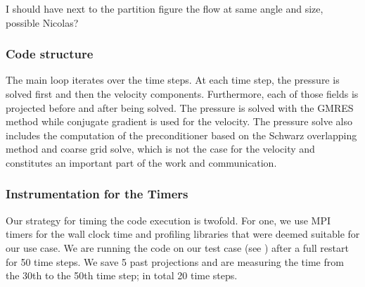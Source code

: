 \documentclass{sig-alternate}
\begin{document}
I should have next to the partition figure the flow at same angle and size, possible Nicolas? 
\subsubsection{Code structure}
\label{sec:code}

The main loop iterates over the time steps. At each time step, the pressure is solved first and then the velocity components. Furthermore, each of those fields is projected before and after being solved. The pressure is solved with the GMRES method while conjugate gradient is used for the velocity. The pressure solve also includes the computation of the preconditioner based on the Schwarz overlapping method and coarse grid solve, which is not the case for the velocity and constitutes an important part of the work and communication.

\subsubsection{Instrumentation for the Timers}
\label{sec:timers}
Our strategy for timing the code execution is twofold. For one, we use MPI
timers for the wall clock time and profiling libraries that were deemed suitable
for our use case. We are running the code on our test case (see
) after a full restart for 50 time steps. We save 5 past
projections and are measuring the time from the 30th to the 50th time step; in
total 20 time steps. 
\end{document}
